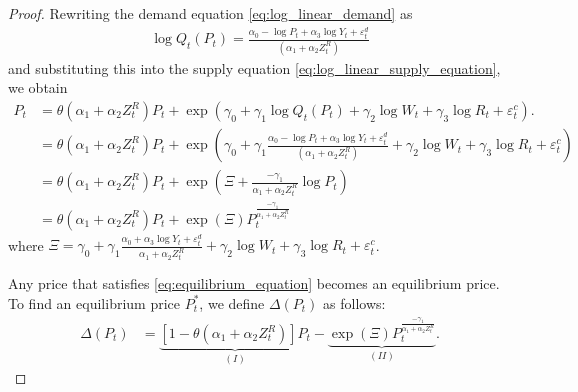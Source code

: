 \documentclass[11pt, a4paper]{article}
\begin{document}
\begin{proof}
    
Rewriting the demand equation \eqref{eq:log_linear_demand} as 
\begin{align*}
    \log Q_{t}(P_{t})= \frac{\alpha_0 - \log P_{t} + \alpha_3 \log Y_t + \varepsilon^{d}_{t}}{(\alpha_1 + \alpha_2 Z^{R}_{t})}   
\end{align*}
and substituting this into the supply equation \eqref{eq:log_linear_supply_equation}, we obtain
\begin{align}
    P_t &=\theta (\alpha_1 + \alpha_2 Z^{R}_{t}) P_t + \exp\left(\gamma_0 + \gamma_1 \log Q_t(P_{t}) +  \gamma_2 \log W_{t} + \gamma_3 \log R_t + \varepsilon^{c}_{t}\right). \nonumber\\
    & = \theta(\alpha_1 + \alpha_2 Z^{R}_{t})P_t + \exp\left(\gamma_0 + \gamma_1 \frac{\alpha_0 - \log P_{t} + \alpha_3 \log Y_t + \varepsilon^{d}_{t}}{(\alpha_1 + \alpha_2 Z^{R}_{t})} +\gamma_2 \log W_{t} + \gamma_3 \log R_{t} + \varepsilon^{c}_{t} \right)\nonumber\\
    & = \theta(\alpha_1 + \alpha_2 Z^{R}_{t})P_t  + \exp\left(\Xi + \frac{-\gamma_1}{\alpha_1+\alpha_2 Z^{R}_t} \log P_t \right)\nonumber\\
    &= \theta(\alpha_1 + \alpha_2 Z^{R}_{t})P_t  + \exp(\Xi) P_t^{\frac{-\gamma_1}{\alpha_1 + \alpha_2 Z^{R}_{t}}} \label{eq:equilibrium_equation}
\end{align}
where $\Xi = \gamma_0 + \gamma_1\frac{\alpha_0 + \alpha_3 \log Y_t + \varepsilon^{d}_{t}}{\alpha_1 + \alpha_2 Z^{R}_{t}} +  \gamma_2 \log W_{t} + \gamma_3 \log R_t + \varepsilon^{c}_{t}$.

Any price that satisfies \eqref{eq:equilibrium_equation} becomes an equilibrium price.
To find an equilibrium price $P_{t}^*$, we define $\Delta(P_t)$ as follows:
\begin{align}
    \Delta(P_t)
    &= \underbrace{[1 - \theta (\alpha_1 + \alpha_2 Z^{R}_{t})]P_t}_{(I)} - \underbrace{\exp(\Xi) P_t^{\frac{-\gamma_1}{\alpha_1 + \alpha_2 Z^{R}_{t}}}}_{(II)} \label{eq:fixed_point}.
\end{align}


\end{proof}
\end{document}
